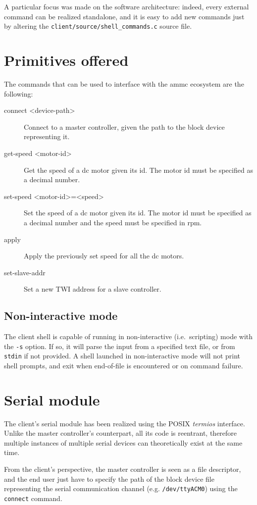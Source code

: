 \documentclass[binding=0.6cm,Lau]{sapthesis}
\begin{document}
A particular focus was made on the software architecture: indeed, every
external command can be realized standalone, and it is easy to add new
commands just by altering the \texttt{client/source/shell\_commands.c} source
file.

\section{Primitives offered}
The commands that can be used to interface with the ammc ecosystem are the
following:
\begin{description}
  \item[connect <device-path>] Connect to a master controller, given the path
    to the block device representing it.
  \item[get-speed <motor-id>] Get the speed of a dc motor given its id.
    The motor id must be specified as a decimal number.
  \item[set-speed <motor-id>=<speed>] Set the speed of a dc motor given its id.
    The motor id must be specified as a decimal number and the speed must be
    specified in rpm.
  \item[apply] Apply the previously set speed for all the dc motors.
  \item[set-slave-addr] Set a new TWI address for a slave controller.
\end{description}

\subsection{Non-interactive mode}
The client shell is capable of running in non-interactive (i.e.\ scripting)
mode with the \texttt{-s} option.  If so, it will parse the input from a
specified text file, or from \texttt{stdin} if not provided.  A shell launched
in non-interactive mode will not print shell prompts, and exit when end-of-file
is encountered or on command failure.

\section{Serial module}
The client's serial module has been realized using the POSIX \emph{termios}
interface. Unlike the master controller's counterpart, all its code is
reentrant, therefore multiple instances of multiple serial devices can
theoretically exist at the same time.

From the client's perspective, the master controller is seen as a file
descriptor, and the end user just have to specify the path of the block device
file representing the serial communication channel (e.g. \texttt{/dev/ttyACM0})
using the \texttt{connect} command.
\end{document}
